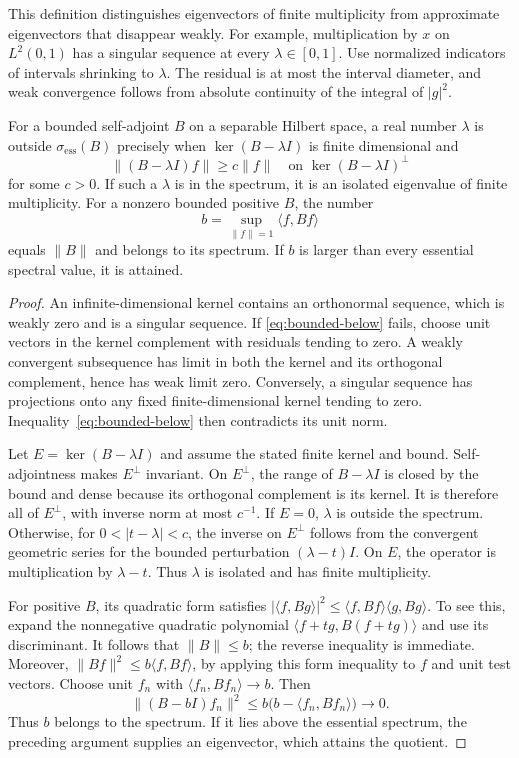 \documentclass[11pt]{article}
\newcommand{\ip}[2]{\langle #1,#2\rangle}
\newcommand{\norm}[1]{\lVert #1\rVert}
\begin{document}
This definition distinguishes eigenvectors of finite multiplicity from
approximate eigenvectors that disappear weakly.
For example, multiplication by $x$ on $L^2(0,1)$ has a singular sequence
at every $\lambda\in[0,1]$.
Use normalized indicators of intervals shrinking to $\lambda$.
The residual is at most the interval diameter, and weak convergence
follows from absolute continuity of the integral of $|g|^2$.

\begin{lemma}
\label{lem:spectral}
For a bounded self-adjoint $B$ on a separable Hilbert space,
a real number $\lambda$ is outside
$\sigma_{\mathrm{ess}}(B)$ precisely when $\ker(B-\lambda I)$ is finite
dimensional and
\begin{equation}\label{eq:bounded-below}
 \norm{(B-\lambda I)f}\geq c\norm f
       \quad\text{on }\ker(B-\lambda I)^\perp
\end{equation}
for some $c>0$.
If such a $\lambda$ is in the spectrum, it is an isolated eigenvalue
of finite multiplicity.
For a nonzero bounded positive $B$, the number
\[
                   b=\sup_{\norm f=1}\ip f{Bf}
\]
equals $\norm B$ and belongs to its spectrum.
If $b$ is larger than every essential spectral value, it is attained.
\end{lemma}

\begin{proof}
An infinite-dimensional kernel contains an orthonormal sequence, which
is weakly zero and is a singular sequence.
If \eqref{eq:bounded-below} fails, choose unit vectors in the kernel
complement with residuals tending to zero.
A weakly convergent subsequence has limit in both the kernel and its
orthogonal complement, hence has weak limit zero.
Conversely, a singular sequence has projections onto any fixed
finite-dimensional kernel tending to zero.
Inequality~\eqref{eq:bounded-below} then contradicts its unit norm.

Let $E=\ker(B-\lambda I)$ and assume the stated finite kernel and bound.
Self-adjointness makes $E^\perp$ invariant.
On $E^\perp$, the range of $B-\lambda I$ is closed by the bound and
dense because its orthogonal complement is its kernel.
It is therefore all of $E^\perp$, with inverse norm at most $c^{-1}$.
If $E=0$, $\lambda$ is outside the spectrum.
Otherwise, for $0<|t-\lambda|<c$, the inverse on $E^\perp$ follows
from the convergent geometric series for the bounded perturbation
$(\lambda-t)I$.  On $E$, the operator is multiplication by $\lambda-t$.
Thus $\lambda$ is isolated and has finite multiplicity.

For positive $B$, its quadratic form satisfies
$|\ip f{Bg}|^2\leq\ip f{Bf}\ip g{Bg}$.
To see this, expand the nonnegative quadratic polynomial
$\ip{f+tg}{B(f+tg)}$ and use its discriminant.
It follows that $\norm B\leq b$; the reverse inequality is immediate.
Moreover, $\norm{Bf}^2\leq b\ip f{Bf}$, by applying this form inequality
to $f$ and unit test vectors.
Choose unit $f_n$ with $\ip{f_n}{Bf_n}\to b$.
Then
\[
 \norm{(B-bI)f_n}^2\leq b\bigl(b-\ip{f_n}{Bf_n}\bigr)\to0.
\]
Thus $b$ belongs to the spectrum.
If it lies above the essential spectrum, the preceding argument supplies
an eigenvector, which attains the quotient.
\end{proof}
\end{document}
